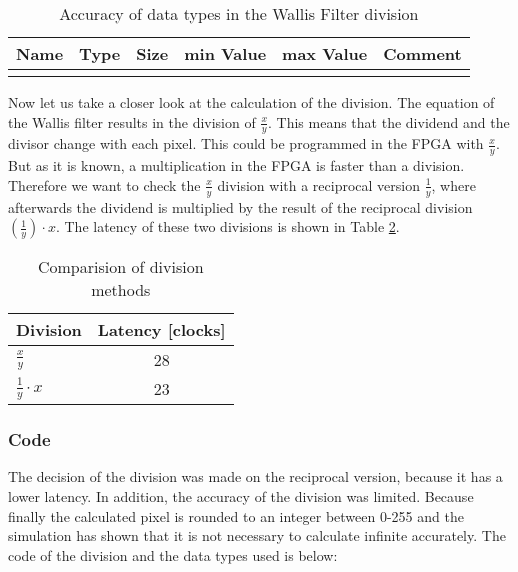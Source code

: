 \begin{table}[tb!]
    \centering
    \begin{tabular}{l l l l l l}
        \toprule
        Name & Type & Size & min Value & max Value & Comment \\
        \midrule
        &  &  &  &  & 
        \\

        \bottomrule
    \end{tabular}
    \caption{Accuracy of data types in the Wallis Filter division}
    \label{tab:datatypes}
\end{table}

Now let us take a closer look at the calculation of the division. The equation of the Wallis filter results in the division of $\frac{x}{y}$. This means that the dividend and the divisor change with each pixel. This could be programmed in the FPGA with $\frac{x}{y}$. But as it is known, a multiplication in the FPGA is faster than a division. Therefore we want to check the $\frac{x}{y}$ division with a reciprocal version $\frac{1}{y}$, where afterwards the dividend is multiplied by the result of the reciprocal division $(\frac{1}{y}) \cdot x$. The latency of these two divisions is shown in Table \ref{tab:c_div}. \\

\begin{table}[tb!]
    \centering
    \begin{tabular}{l c}
        \toprule
        Division & Latency [clocks]  \\
        \midrule
        $\frac{x}{y}$ & 28 
        \\
        $\frac{1}{y} \cdot x$ & 23 
        \\
        \bottomrule
    \end{tabular}
    \caption{Comparision of division methods}
    \label{tab:c_div}
\end{table}

\subsubsection*{Code}
The decision of the division was made on the reciprocal version, because it has a lower latency. In addition, the accuracy of the division was limited. Because finally the calculated pixel is rounded to an integer between 0-255 and the simulation has shown that it is not necessary to calculate infinite accurately. The code of the division and the data types used is below:

